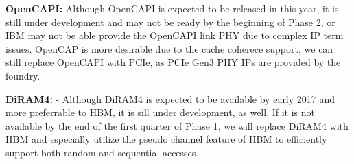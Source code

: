 \noindent
\textbf{OpenCAPI:} Although OpenCAPI is expected to be released in this year, it is still under development and may not be ready by the beginning of Phase 2, or IBM may not be able provide the OpenCAPI link PHY due to complex IP term issues.
OpenCAP is more desirable due to the cache coherece support, we can still replace OpenCAPI with PCIe, as PCIe Gen3 PHY IPs are provided by the foundry.

\noindent
\textbf{DiRAM4:} - Although DiRAM4 is expected to be available by early 2017 and more preferrable to HBM, it is sill under development, as well.
If it is not available by the end of the first quarter of Phase 1, we will replace DiRAM4 with HBM and especially utilize the pseudo channel feature of HBM to efficiently support both random and sequential accesses. 

